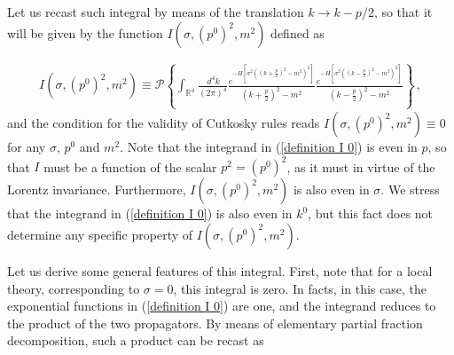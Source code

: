 \documentclass[a4paper,11pt]{article}
\newcommand{\be}{\begin{eqnarray}}
\newcommand{\ee}{\end{eqnarray}}
\begin{document}
Let us recast such integral by means of the translation $k\rightarrow k-p/2$, so that  it will be given by the function $I(\sigma,(p^0)^2,m^2)$ defined as











\be\label{definition I 0}
I(\sigma,(p^0)^2,m^2) \equiv \mathcal{P}\left\{\int_{ \mathbb{R}^4} \frac{ \, d^4 k}{(2\pi)^4}
\frac{e^{-H\left[\sigma^2\left(\left(k+\frac{p}{2}\right)^2-m^2\right)^2\right]}}{(k+\frac{p}{2})^2 - m^2 } \frac{e^{-H\left[\sigma^2\left(\left(k-\frac{p}{2}\right)^2-m^2\right)^2\right]}}{(k-\frac{p}{2})^2 - m^2 }\right\}\, ,
\ee
and the condition for the validity of Cutkosky  rules  reads   $I(\sigma,(p^0)^2,m^2)\equiv 0$ for any $\sigma$, $p^0$ and $m^2$.
Note that  the integrand in (\ref{definition I 0}) is even in $p$, so that $I$ must be a function of the scalar $p^2 =(p^0)^2$, as it must in virtue of the Lorentz invariance. Furthermore, 
$I(\sigma,(p^0)^2,m^2)$ is also even in $\sigma$. We stress that the integrand in (\ref{definition I 0}) is also even in $k^0$, but this fact does not determine any specific property of $I(\sigma,(p^0)^2,m^2)$.



Let us derive some general features of this integral. First, note that for  a local theory, corresponding to $\sigma = 0$, this integral is zero. In facts, in this case, the exponential functions in  (\ref{definition I 0}) are  one, and the integrand reduces to the product of the two propagators. By means of elementary partial fraction decomposition, such a product can be recast as
\end{document}
